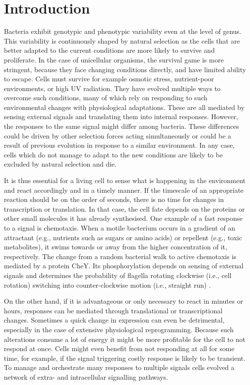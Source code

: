 \chapter{Introduction}
\setcounter{page}{1}

\shorthandoff{-}

Bacteria exhibit genotypic and phenotypic variability even at the level of genus.
This variability is continuously shaped by natural selection as the cells that are better adapted to the current conditions are more likely to survive and proliferate.
In the case of unicellular organisms, the survival game is more stringent, because they face changing conditions directly, and have limited ability to escape.
Cells must survive for example osmotic stress, nutrient-poor environments, or high UV radiation. They have evolved multiple ways to overcome such conditions, many of which rely on responding to such environmental changes with physiological adaptations.
These are all mediated by sensing external signals and translating them into internal responses.
However, the responses to the same signal might differ among bacteria.
These differences could be driven by other selection forces acting simultaneously or could be a result of previous evolution in response to a similar environment.
In any case, cells which do not manage to adapt to the new conditions are likely to be excluded by natural selection and die.

It is thus essential for a living cell to sense what is happening in the environment and react accordingly and in a timely manner.
If the timescale of an appropriate reaction should be on the order of seconds, there is no time for changes in transcription or translation.
In that case, the cell fate depends on the proteins or other small molecules it has already synthesised.
One example of a fast response to a signal is chemotaxis.
When a motile bacterium occurs in a gradient of an attractant (e.g., nutrients such as sugars or amino acids) or repellent (e.g., toxic metabolites), it swims towards or away from the higher concentration of it, respectively.
The change from a random bacterial walk to active chemotaxis is mediated by a protein CheY.
Its phosphorylation depends on sensing of external signals and determines the probability of flagella rotating clockwise (i.e., cell rotation) switching into counter-clockwise motion (i.e., straight run) \cite{shimizu2010modular, mears2014escherichia}.

On the other hand, if it is advantageous or only necessary to react in minutes or hours, responses can be mediated through translational or transcriptional changes.
Sometimes a quick change in expression can even be detrimental, especially in the case of extensive physiological reprogramming.
Because such alterations consume a lot of energy it might be more profitable for the cell to not respond at once.
Cells might even benefit from not responding at all for some time, for example, if the signal triggering costly response is likely to be transient.
To manage and orchestrate many responses to multiple signals cells evolved a network of extra- and intracellular signalling pathways.

